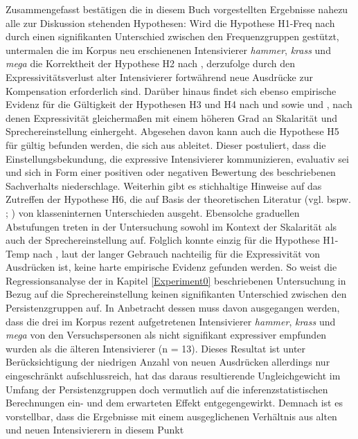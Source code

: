 Zusammengefasst bestätigen die in diesem Buch vorgestellten Ergebnisse nahezu alle zur Diskussion stehenden Hypothesen: Wird die Hypothese H1-Freq nach \citet[2]{Hauschild.1899} durch einen signifikanten Unterschied zwischen den Frequenzgruppen gestützt, untermalen die im Korpus neu erschienenen Intensivierer \textit{hammer}, \textit{krass} und \textit{mega} die Korrektheit der Hypothese H2 nach \citet[274]{Baumgarten.1908}, derzufolge durch den Expressivitätsverlust alter Intensivierer fortwährend neue Ausdrücke zur Kompensation erforderlich sind. Darüber hinaus findet sich ebenso empirische Evidenz für die Gültigkeit der Hypothesen H3 und H4 nach \citet[22]{Paradis.1997} und \citet[133]{Gutzmann.2019a} sowie \citet[315]{Lang.1983} und \citet[57]{Ortner.2014}, nach denen Expressivität gleichermaßen mit einem höheren Grad an Skalarität und Sprechereinstellung einhergeht. Abgesehen davon kann auch die Hypothese H5 für gültig befunden werden, die sich aus \citet[135]{Gutzmann.2019a} ableitet. Dieser postuliert, dass die Einstellungsbekundung, die expressive Intensivierer kommunizieren, evaluativ sei und sich in Form einer positiven oder negativen Bewertung des beschriebenen Sachverhalts niederschlage. Weiterhin gibt es stichhaltige Hinweise auf das Zutreffen der Hypothese H6, die auf Basis der theoretischen Literatur (vgl. bspw. \citealt[87]{Biedermann.1969}; \citealt[408]{Breindl.2007}) von klasseninternen Unterschieden ausgeht. Ebensolche graduellen Abstufungen  treten in der Untersuchung sowohl im Kontext der Skalarität als auch der Sprechereinstellung auf. Folglich konnte einzig für die Hypothese H1-Temp nach \citet[59]{Tobler.1868}, laut der langer Gebrauch nachteilig für die Expressivität von Ausdrücken ist, keine harte empirische Evidenz gefunden werden. So weist die Regressionsanalyse der in Kapitel \ref{Experiment0} beschriebenen Untersuchung in Bezug auf die Sprechereinstellung keinen signifikanten Unterschied zwischen den Persistenzgruppen auf. In Anbetracht dessen muss davon ausgegangen werden, dass die drei im Korpus rezent aufgetretenen Intensivierer \textit{hammer}, \textit{krass} und \textit{mega} von den Versuchspersonen als nicht signifikant expressiver empfunden wurden als die älteren Intensivierer (n = 13). Dieses Resultat ist unter Berücksichtigung der niedrigen Anzahl von neuen Ausdrücken allerdings nur eingeschränkt aufschlussreich, hat das daraus resultierende Ungleichgewicht im Umfang der Persistenzgruppen doch vermutlich auf die inferenzstatistischen Berechnungen ein- und dem erwarteten Effekt entgegengewirkt. Demnach ist es vorstellbar, dass die Ergebnisse mit einem ausgeglichenen Verhältnis aus alten und neuen Intensivierern in diesem Punkt

